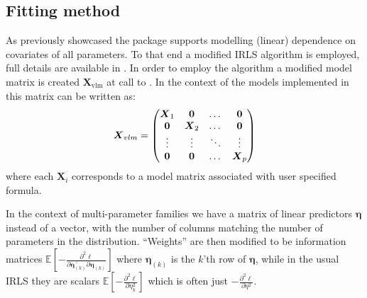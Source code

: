 \documentclass[
]{jss}
\newcommand{\1}{\mathcal{I}} \newcommand{\bZero}{\boldsymbol{0}}
\begin{document}
\subsection{Fitting method}\label{fitting-method}

As previously showcased the  package supports
modelling (linear) dependence on covariates of all parameters. To that
end a modified IRLS algorithm is employed, full details are available in
\cite{VGAM-main}. In order to employ the algorithm a modified model
matrix is created \(\boldsymbol{X}_{\text{vlm}}\) at call to
. In the context of the models implemented in
 this matrix can be written as:
\begin{equation}\label{X_vlm-definition}
  \boldsymbol{X}_{vlm}=
  \begin{pmatrix}
    \boldsymbol{X}_{1} & \boldsymbol{0}&\dotso &\boldsymbol{0}\cr
    \boldsymbol{0}& \boldsymbol{X}_{2} &\dotso &\boldsymbol{0}\cr
    \vdots & \vdots & \ddots & \vdots\cr
    \boldsymbol{0}& \boldsymbol{0}&\dotso &\boldsymbol{X}_{p}
  \end{pmatrix}
\end{equation} where each \(\boldsymbol{X}_{i}\) corresponds to a model
matrix associated with user specified formula.

In the context of multi-parameter families we have a matrix of linear
predictors \(\boldsymbol{\eta}\) instead of a vector, with the number of
columns matching the number of parameters in the distribution.
``Weights'' are then modified to be information matrices
\(\displaystyle\mathbb{E}\left[-\frac{\partial^{2}\ell}{\partial\boldsymbol{\eta}_{(k)}^\top\partial\boldsymbol{\eta}_{(k)}}\right]\)
where \(\boldsymbol{\eta}_{(k)}\) is the \(k\)'th row of
\(\boldsymbol{\eta}\), while in the usual IRLS they are scalars
\(\displaystyle\mathbb{E}\left[-\frac{\partial^{2}\ell}{\partial\eta_{k}^{2}}\right]\)
which is often just
\(\displaystyle-\frac{\partial^{2}\ell}{\partial\eta^{2}}\).
\end{document}
